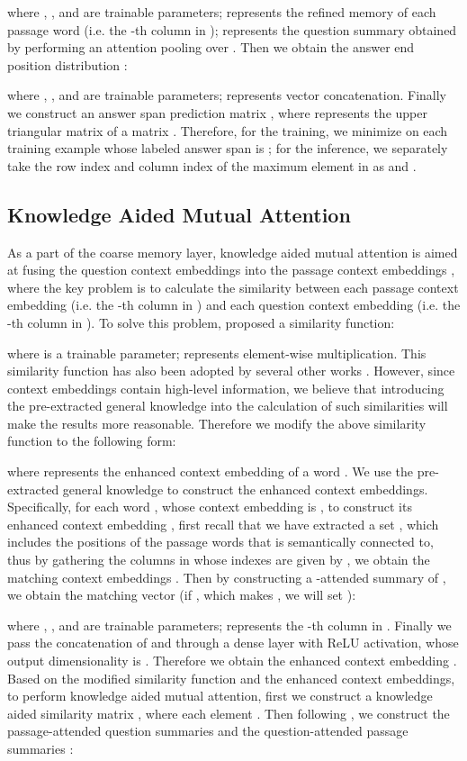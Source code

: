 \documentclass[11pt,a4paper]{article}
\begin{document}
where , , and  are trainable parameters;  represents the refined memory of each passage word  (i.e. the -th column in );  represents the question summary obtained by performing an attention pooling over . Then we obtain the answer end position distribution :


where , , and  are trainable parameters;  represents vector concatenation. Finally we construct an answer span prediction matrix , where  represents the upper triangular matrix of a matrix . Therefore, for the training, we minimize  on each training example whose labeled answer span is ; for the inference, we separately take the row index and column index of the maximum element in  as  and .

\subsection{Knowledge Aided Mutual Attention}
As a part of the coarse memory layer, knowledge aided mutual attention is aimed at fusing the question context embeddings  into the passage context embeddings , where the key problem is to calculate the similarity between each passage context embedding  (i.e. the -th column in ) and each question context embedding  (i.e. the -th column in ). To solve this problem, \citet{seominjoon:2016} proposed a similarity function:

where  is a trainable parameter;  represents element-wise multiplication. This similarity function has also been adopted by several other works \cite{clarkchristopher:2017,yuadamswei:2018}. However, since context embeddings contain high-level information, we believe that introducing the pre-extracted general knowledge into the calculation of such similarities will make the results more reasonable. Therefore we modify the above similarity function to the following form:

where  represents the enhanced context embedding of a word . We use the pre-extracted general knowledge to construct the enhanced context embeddings. Specifically, for each word , whose context embedding is , to construct its enhanced context embedding , first recall that we have extracted a set , which includes the positions of the passage words that  is semantically connected to, thus by gathering the columns in  whose indexes are given by , we obtain the matching context embeddings . Then by constructing a -attended summary of , we obtain the matching vector  (if , which makes , we will set ):


where , , and  are trainable parameters;  represents the -th column in . Finally we pass the concatenation of  and  through a dense layer with ReLU activation, whose output dimensionality is . Therefore we obtain the enhanced context embedding . \\
Based on the modified similarity function and the enhanced context embeddings, to perform knowledge aided mutual attention, first we construct a knowledge aided similarity matrix , where each element . Then following \citet{yuadamswei:2018}, we construct the passage-attended question summaries  and the question-attended passage summaries :
\end{document}
